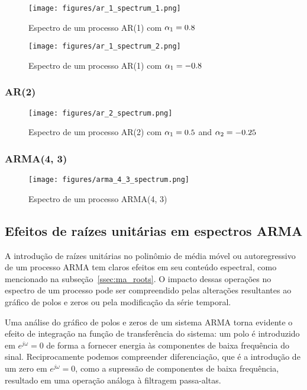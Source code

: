 \begin{figure}[H]
    \centering
    \texttt{[image: figures/ar\_1\_spectrum\_1.png]}
    \caption{Espectro de um processo AR(1) com
    $\protect \alpha_1 = 0.8$}
    \label{fig:ar_1_spectrum_1}
\end{figure}

\begin{figure}[H]
    \centering
    \texttt{[image: figures/ar\_1\_spectrum\_2.png]}
    \caption{Espectro de um processo AR(1) com
    $\protect \alpha_1 = -0.8$}
    \label{fig:ar_1_spectrum_2}
\end{figure}

\subsubsection{AR(2)}

\begin{figure}[H]
    \centering
    \texttt{[image: figures/ar\_2\_spectrum.png]}
    \caption{Espectro de um processo AR(2) com
    $\protect \alpha_1 = 0.5$ and $\protect \alpha_2 = -0.25$}
    \label{fig:ar_2_spectrum}
\end{figure}

\subsubsection{ARMA(4, 3)}

\begin{figure}[H]
    \centering
    \texttt{[image: figures/arma\_4\_3\_spectrum.png]}
    \caption{Espectro de um processo ARMA(4, 3)}
    \label{fig:ar_4_3_spectrum}
\end{figure}


\subsection{Efeitos de raízes unitárias em espectros ARMA}

A introdução de raízes unitárias no polinômio de média móvel ou autoregressivo
de um processo ARMA tem claros efeitos em seu conteúdo espectral, como
mencionado na subseção~\ref{ssec:ma_roots}. O impacto dessas operações no
espectro de um processo pode ser compreendido pelas alterações resultantes ao
gráfico de polos e zeros ou pela modificação da série temporal.

Uma análise do gráfico de polos e zeros de um sistema ARMA torna evidente o
efeito de integração na função de transferência do sistema: um polo é
introduzido em $e^{j\omega}=0$ de forma a fornecer energia às componentes de
baixa frequência do sinal. Reciprocamente podemos compreender diferenciação,
que é a introdução de um zero em $e^{j\omega}=0$, como a supressão de
componentes de baixa frequência, resultado em uma operação análoga à filtragem
passa-altas.

